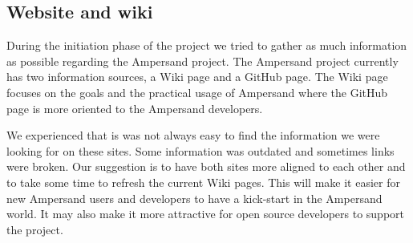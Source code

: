 
\subsection{Website and wiki}
\label{recommendations:website}
During the initiation phase of the project we tried to gather as much information as possible regarding the Ampersand project.
The Ampersand project currently has two information sources, a Wiki page and a GitHub page.
The Wiki page focuses on the goals and the practical usage of Ampersand where the GitHub page is more oriented to the Ampersand developers.

We experienced that is was not always easy to find the information we were looking for on these sites.
Some information was outdated and sometimes links were broken. 
Our suggestion is to have both sites more aligned to each other and to take some time to refresh the current Wiki pages.
This will make it easier for new Ampersand users and developers to have a kick-start in the Ampersand world.
It may also make it more attractive for open source developers to support the project.
